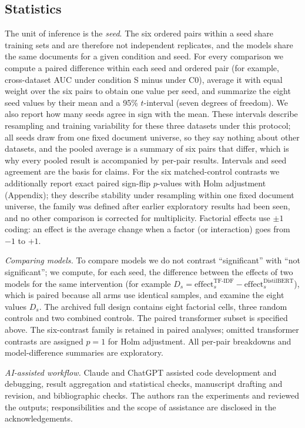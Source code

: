 \subsection{Statistics}\label{sec:stats}
The unit of inference is the \emph{seed}. The six ordered pairs within a seed share training sets and are therefore not independent replicates, and the models share the same documents for a given condition and seed. For every comparison we compute a paired difference within each seed and ordered pair (for example, cross-dataset AUC under condition S minus under C0), average it with equal weight over the six pairs to obtain one value per seed, and summarize the eight seed values by their mean and a 95\% $t$-interval (seven degrees of freedom). We also report how many seeds agree in sign with the mean. These intervals describe resampling and training variability for these three datasets under this protocol; all seeds draw from one fixed document universe, so they say nothing about other datasets, and the pooled average is a summary of six pairs that differ, which is why every pooled result is accompanied by per-pair results. Intervals and seed agreement are the basis for claims. For the six matched-control contrasts we additionally report exact paired sign-flip $p$-values with Holm adjustment~\cite{holm1979simple} (Appendix); they describe stability under resampling within one fixed document universe, the family was defined after earlier exploratory results had been seen, and no other comparison is corrected for multiplicity. Factorial effects use $\pm1$ coding: an effect is the average change when a factor (or interaction) goes from $-1$ to $+1$.

\emph{Comparing models.} To compare models we do not contrast ``significant'' with ``not significant''; we compute, for each seed, the difference between the effects of two models for the same intervention (for example $D_s=\text{effect}^{\text{TF-IDF}}_s-\text{effect}^{\text{DistilBERT}}_s$), which is paired because all arms use identical samples, and examine the eight values $D_s$. The archived full design contains eight factorial cells, three random controls and two combined controls. The paired transformer subset is specified above. The six-contrast family is retained in paired analyses; omitted transformer contrasts are assigned $p=1$ for Holm adjustment. All per-pair breakdowns and model-difference summaries are exploratory.

\emph{AI-assisted workflow.} Claude and ChatGPT assisted code development and debugging, result aggregation and statistical checks, manuscript drafting and revision, and bibliographic checks. The authors ran the experiments and reviewed the outputs; responsibilities and the scope of assistance are disclosed in the acknowledgements.
